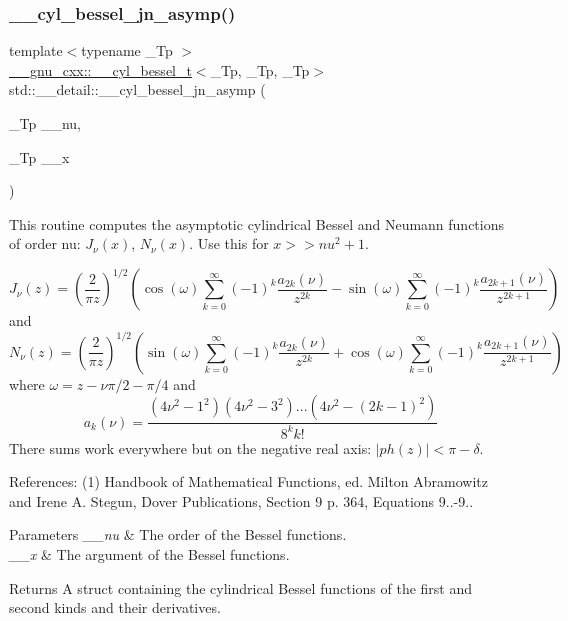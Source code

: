 \subsubsection{\texorpdfstring{\+\_\+\+\_\+cyl\+\_\+bessel\+\_\+jn\+\_\+asymp()}{\_\_cyl\_bessel\_jn\_asymp()}}
{\footnotesize\ttfamily template$<$typename \+\_\+\+Tp $>$ \\
\hyperlink{struct____gnu__cxx_1_1____cyl__bessel__t}{\+\_\+\+\_\+gnu\+\_\+cxx\+::\+\_\+\+\_\+cyl\+\_\+bessel\+\_\+t}$<$\+\_\+\+Tp, \+\_\+\+Tp, \+\_\+\+Tp$>$ std\+::\+\_\+\+\_\+detail\+::\+\_\+\+\_\+cyl\+\_\+bessel\+\_\+jn\+\_\+asymp (\begin{DoxyParamCaption}\item[{\+\_\+\+Tp}]{\+\_\+\+\_\+nu,  }\item[{\+\_\+\+Tp}]{\+\_\+\+\_\+x }\end{DoxyParamCaption})}



This routine computes the asymptotic cylindrical Bessel and Neumann functions of order nu\+: $ J_{\nu}(x) $, $ N_{\nu}(x) $. Use this for $ x >> nu^2 + 1 $. 

\[ J_{\nu}(z) = \left(\frac{2}{\pi z}\right)^{1/2} \left( \cos(\omega)\sum_{k=0}^{\infty}(-1)^k\frac{a_{2k}(\nu)}{z^{2k}} - \sin(\omega)\sum_{k=0}^{\infty}(-1)^k\frac{a_{2k+1}(\nu)}{z^{2k+1}} \right) \] and \[ N_{\nu}(z) = \left(\frac{2}{\pi z}\right)^{1/2} \left( \sin(\omega)\sum_{k=0}^{\infty}(-1)^k\frac{a_{2k}(\nu)}{z^{2k}} + \cos(\omega)\sum_{k=0}^{\infty}(-1)^k\frac{a_{2k+1}(\nu)}{z^{2k+1}} \right) \] where $ \omega = z - \nu\pi/2 - \pi/4 $ and \[ a_{k}(\nu) = \frac{(4\nu^2 - 1^2)(4\nu^2 - 3^2)...(4\nu^2 - (2k-1)^2)} {8^k k!} \] There sums work everywhere but on the negative real axis\+: $ |ph(z)| < \pi - \delta $.

References\+: (1) Handbook of Mathematical Functions, ed. Milton Abramowitz and Irene A. Stegun, Dover Publications, Section 9 p. 364, Equations 9..-\/9..


\begin{DoxyParams}{Parameters}
{\em \+\_\+\+\_\+nu} & The order of the Bessel functions. \\
\hline
{\em \+\_\+\+\_\+x} & The argument of the Bessel functions. \\
\hline
\end{DoxyParams}
\begin{DoxyReturn}{Returns}
A struct containing the cylindrical Bessel functions of the first and second kinds and their derivatives. 
\end{DoxyReturn}


